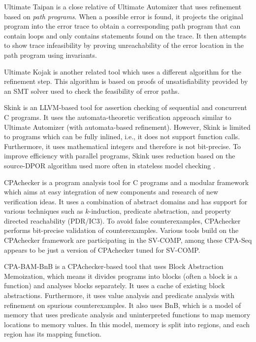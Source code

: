 Ultimate Taipan  is a close relative of Ultimate Automizer that uses refinement based on \emph{path programs}.
When a possible error is found, it projects the original program into the error trace to obtain a corresponding path program that can contain loops and only contains statements found on the trace.
It then attempts to show trace infeasibility by proving unreachability of the error location in the path program using invariants.

Ultimate Kojak  is another related tool which uses a different algorithm for the refinement step.
This algorithm is based on proofs of unsatisfiability provided by an SMT solver used to check the feasibility of error paths.

Skink  is an LLVM-based tool for assertion checking of sequential and concurrent C programs.
It uses the automata-theoretic verification approach similar to Ultimate Automizer (with automata-based refinement).
However, Skink is limited to programs which can be fully inlined, i.e., it does not support function calls.
Furthermore, it uses mathematical integers and therefore is not bit-precise.
To improve efficiency with parallel programs, Skink uses reduction based on the source-DPOR algorithm used more often in stateless model checking .

CPAchecker  is a program analysis tool for C programs and a modular framework which aims at easy integration of new components and research of new verification ideas.
It uses a combination of abstract domains and has support for various techniques such as $k$-induction, predicate abstraction, and property directed reachability (PDR/IC3).
To avoid false counterexamples, CPAchecker performs bit-precise validation of counterexamples.
Various tools build on the CPAchecker framework are participating in the SV-COMP, among these CPA-Seq appears to be just a version of CPAchecker tuned for SV-COMP.

CPA-BAM-BnB  is a CPAchecker-based tool that uses Block Abstraction Memoization, which means it divides programs into blocks (often a block is a function) and analyses blocks separately.
It uses a cache of existing block abstractions.
Furthermore, it uses value analysis and predicate analysis with refinement on spurious counterexamples.
It also uses BnB, which is a model of memory that uses predicate analysis and uninterpreted functions to map memory locations to memory values.
In this model, memory is split into regions, and each region has its mapping function.

